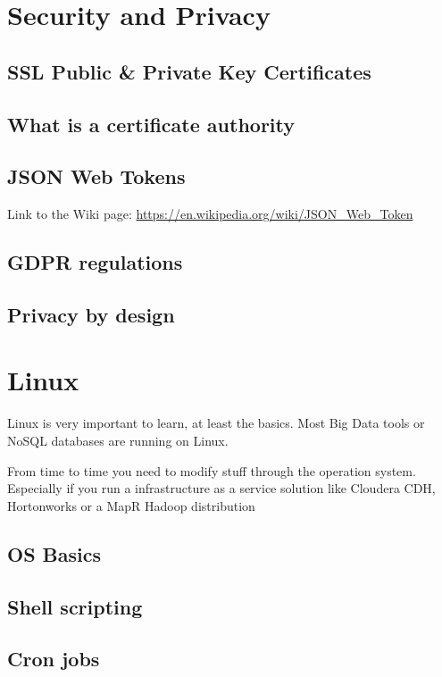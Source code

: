 \documentclass[12pt, numbers=noenddot]{scrreprt} %
\begin{document}
\chapter{Security and Privacy}
\section{SSL Public \& Private Key Certificates}

\section{What is a certificate authority}

\section{JSON Web Tokens}

Link to the Wiki page: \url{https://en.wikipedia.org/wiki/JSON_Web_Token}

\section{GDPR regulations}

\section{Privacy by design}

\chapter{Linux}

Linux is very important to learn, at least the basics. Most Big Data tools or NoSQL databases are running on Linux. 

From time to time you need to modify stuff through the operation system. Especially if you run a infrastructure as a service solution like Cloudera CDH, Hortonworks or a MapR Hadoop distribution

\section{OS Basics}

\section{Shell scripting}

\section{Cron jobs}
\end{document}
